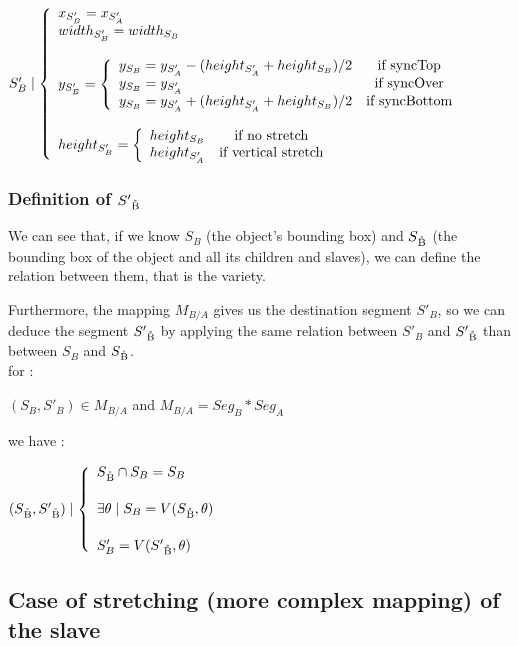 \documentclass[a4paper]{article}
\begin{document}
$S'_B \mid \left\lbrace 
\begin{array}{lcl} 
x_{S'_B} = x_{S'_A}\\
\bigskip
width_{S'_B} = width_{S_B}\\
\bigskip
y _{S'_B} = \left\lbrace
\begin{array}{lcl}
y_{S_B} = y_{S'_A} - (height_{S'_A} + height_{S_B})/2 & \text{if syncTop}\\ 
y_{S_B} = y_{S'_A} & \text{if syncOver}\\
y_{S_B} = y_{S'_A} + (height_{S'_A} + height_{S_B})/2 & \text{if syncBottom}
\end{array}\right.\\
height _{S'_B} = \left\lbrace
\begin{array}{lcl}
height_{S_B} & \text{if no stretch}\\
height_{S'_A} & \text{if vertical stretch}
\end{array}\right.\\
\end{array}\right.$





\subsubsection{Definition of $S'\textsubscript{\r{B}}$}\label{subsubsec:defDestChildRect}

We can see that, if we know $S_B$ (the object's bounding box) and $S\textsubscript{\r{B}}$ (the bounding box of the object and all its children and slaves), we can define the relation between them, that is the variety. 

Furthermore, the mapping $M_{B/A}$ gives us the destination segment $S'_B$, so we can deduce the segment $S'\textsubscript{\r{B}}$ by applying the same relation between $S'_B$ and $S'\textsubscript{\r{B}}$ than between $S_B$ and $S\textsubscript{\r{B}}$.
\\

for : \begin{center} $(S_B, S'_B) \in M_{B/A}$ and $M_{B/A} = Seg_B * Seg_A$ \end{center}

we have :

\begin{center}
$(S\textsubscript{\r{B}}, S'\textsubscript{\r{B}}) \mid \left\lbrace 
\begin{array}{lcl} 
S\textsubscript{\r{B}} \cap S_B = S_B\\ [0.5cm]
\exists \theta \mid S_B = V(S\textsubscript{\r{B}}, \theta)\\ [0.5cm]
S'_B = V(S'\textsubscript{\r{B}}, \theta)
\end{array}\right.$
\end{center}

\subsection{Case of stretching (more complex mapping) of the slave}\label{subsec:complexMap}



\end{document}
